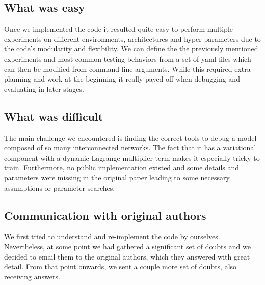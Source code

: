 \subsection{What was easy}

Once we implemented the code it resulted quite easy to perform multiple experiments on different environments, architectures and hyper-parameters due to the code's modularity and flexibility.
We can define the the previously mentioned experiments and most common testing behaviors from a set of yaml files which can then be modified from command-line arguments.
While this required extra planning and work at the beginning it really payed off when debugging and evaluating in later stages. 

\subsection{What was difficult} \label{sec:challenge}


The main challenge we encountered is finding the correct tools to debug a model composed of so many interconnected networks.
The fact that it has a variational component with a dynamic Lagrange multiplier term makes it especially tricky to train.
Furthermore, no public implementation existed and some details and parameters were missing in the original paper leading to some necessary assumptions or parameter searches.


\subsection{Communication with original authors}
We first tried to understand and re-implement the code by ourselves.
Nevertheless, at some point we had gathered a significant set of doubts and we decided to email them to the original authors, which they answered with great detail.
From that point onwards, we sent a couple more set of doubts, also receiving answers.\\

